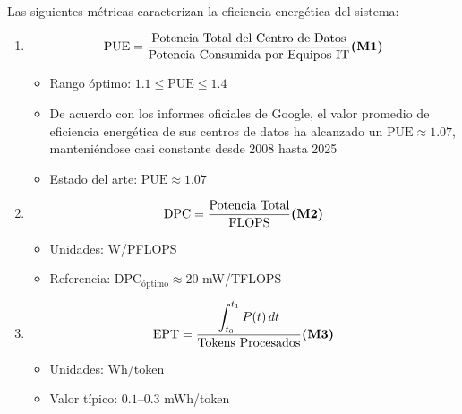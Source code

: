 \begin{definicion}
Las siguientes métricas caracterizan la eficiencia energética del sistema:

\begin{enumerate}
    \item {}
    \begin{equation}
        \text{PUE} = \frac{\text{Potencia Total del Centro de Datos}}{\text{Potencia Consumida por Equipos IT}} \textbf{(M1)}
    \end{equation}
    \begin{itemize}
        \item Rango óptimo: $1.1 \leq \text{PUE} \leq 1.4$
        \item De acuerdo con los informes oficiales de Google, el valor promedio de eficiencia energética de sus centros de datos ha alcanzado un $\text{PUE} \approx 1.07$, manteniéndose casi constante desde 2008 hasta 2025
        \item Estado del arte: $\text{PUE} \approx 1.07$ \parencite{google2025efficiency}
    \end{itemize}

    \item {}
    \begin{equation}
        \text{DPC} = \frac{\text{Potencia Total}}{\text{FLOPS}} \textbf{(M2)}
    \end{equation}
    \begin{itemize}
        \item Unidades: W/PFLOPS
        \item Referencia: $\text{DPC}_{\text{óptimo}} \approx 20$ mW/TFLOPS
    \end{itemize}

    \item {}
    \begin{equation}
        \text{EPT} = \frac{\displaystyle\int_{t_0}^{t_1} P(t)\,dt}{\text{Tokens Procesados}} \textbf{(M3)}
    \end{equation}
    \begin{itemize}
        \item Unidades: Wh/token
        \item Valor típico: $0.1$--$0.3$ mWh/token
    \end{itemize}
\end{enumerate}
\end{definicion}

